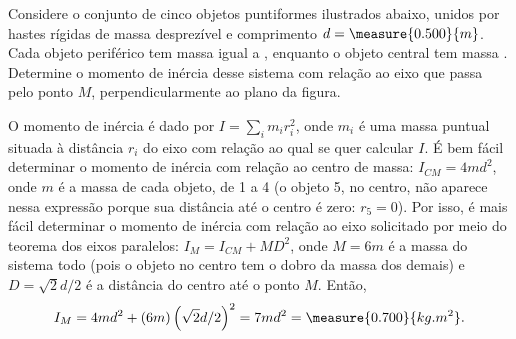 \begin{question}
	Considere o conjunto de cinco objetos puntiformes ilustrados abaixo, unidos por hastes rígidas de massa desprezível e comprimento $d = \measure{0.500}{m}$.
	Cada objeto periférico tem massa igual a , enquanto o objeto central tem massa .
	Determine o momento de inércia desse sistema com relação ao eixo que passa pelo ponto $M$, perpendicularmente ao plano da figura.


	\begin{answer}
	\end{answer}

	\begin{solution}
		O momento de inércia é dado por $I = \sum_i m_i r_i^2$, onde $m_i$ é uma massa puntual situada à distância $r_i$ do eixo com relação ao qual se quer calcular $I$.
		É bem fácil determinar o momento de inércia com relação ao centro de massa: $I_{CM} = 4md^2$, onde $m$ é a massa de cada objeto, de 1 a 4 (o objeto 5, no centro, não aparece nessa expressão porque sua distância até o centro é zero: $r_5 = 0$).
		Por isso, é mais fácil determinar o momento de inércia com relação ao eixo solicitado por meio do teorema dos eixos paralelos: $I_M = I_{CM} + MD^2$, onde $M = 6m$ é a massa do sistema todo (pois o objeto no centro tem o dobro da massa dos demais) e $D = \sqrt{2}d/2$ é a distância do centro até o ponto $M$.
		Então,
		\begin{equation*}
			I_M = 4md^2 + (6m)\left(\sqrt{2}d/2\right)^2 = 7md^2 = \measure{0.700}{kg.m^2}.
		\end{equation*}
	\end{solution}
\end{question}

